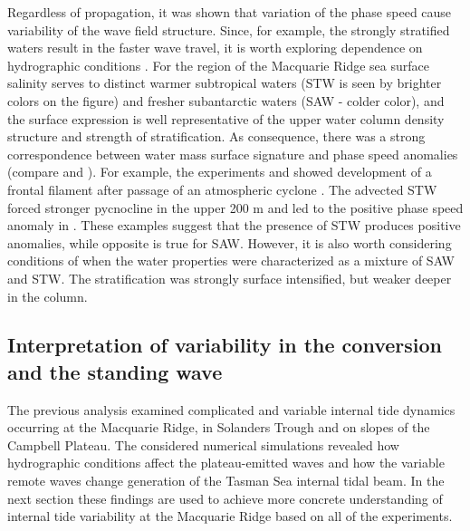 \documentclass[12pt]{article}
\begin{document}
Regardless of propagation, it was shown that variation of the phase speed cause variability of the 
wave field structure. Since, for example, the strongly stratified waters result in the faster wave 
travel, it is worth exploring dependence on hydrographic conditions . 
For the region of 
the Macquarie 
Ridge sea surface salinity serves to distinct warmer subtropical waters (STW is seen by brighter 
colors on the figure) and fresher subantarctic waters (SAW - colder color), and the surface 
expression is well representative of the upper water column density structure and strength of 
stratification. As consequence, there was a strong correspondence between water mass surface 
signature and phase speed anomalies (compare  and 
). For 
example, the experiments  and  showed development of a frontal filament 
after passage of an atmospheric cyclone . The advected STW forced 
stronger pycnocline in the upper 200 m  and led to the positive phase speed anomaly in . These examples suggest that 
the presence of STW produces positive anomalies, while opposite is true for SAW. 
However, it is also worth considering conditions of  when the water properties were 
characterized as a mixture of SAW and STW. The stratification was strongly surface intensified, but 
weaker deeper in the column.\\

\subsection{Interpretation of variability in the conversion and the standing wave}
The previous analysis examined complicated and variable internal tide dynamics occurring at the 
Macquarie Ridge, in Solanders Trough and on slopes of the Campbell Plateau. The considered 
numerical 
simulations revealed how hydrographic conditions affect the plateau-emitted waves and how 
the variable remote waves change generation of the Tasman Sea 
internal tidal beam. In the next section these findings are used to achieve more concrete 
understanding of internal tide variability at the Macquarie Ridge based on all of the experiments.
\end{document}
